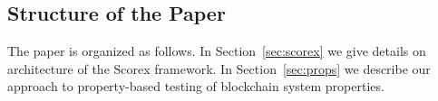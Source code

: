 

\subsection{Structure of the Paper}

The paper is organized as follows. In Section~\ref{sec:scorex} we give details on architecture of the Scorex framework. In Section~\ref{sec:props} we describe our approach to property-based testing of blockchain system properties. ~